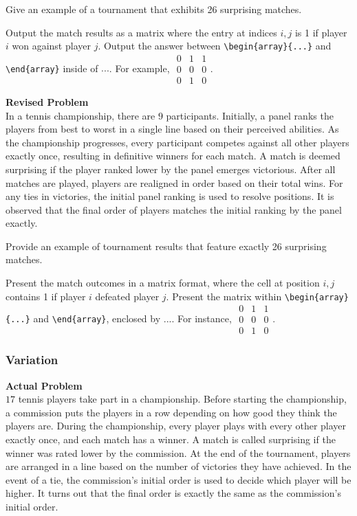Give an example of a tournament that exhibits 26 surprising matches.

Output the match results as a matrix where the entry at indices $i,j$ is 1 if player $i$ won against player $j$. Output the answer between \verb|\begin{array}{...}| and \verb|\end{array}| inside of $\boxed{...}$. For example, $\boxed{\begin{array}{ccc}0 & 1 & 1 \\ 0 & 0 & 0 \\ 0 & 1 & 0\end{array}}$.

\textbf{Revised Problem}\\
In a tennis championship, there are $9$ participants. Initially, a panel ranks the players from best to worst in a single line based on their perceived abilities. As the championship progresses, every participant competes against all other players exactly once, resulting in definitive winners for each match. A match is deemed surprising if the player ranked lower by the panel emerges victorious. After all matches are played, players are realigned in order based on their total wins. For any ties in victories, the initial panel ranking is used to resolve positions. It is observed that the final order of players matches the initial ranking by the panel exactly.

Provide an example of tournament results that feature exactly 26 surprising matches.

Present the match outcomes in a matrix format, where the cell at position $i,j$ contains 1 if player $i$ defeated player $j$. Present the matrix within \verb|\begin{array}{...}| and \verb|\end{array}|, enclosed by $\boxed{...}$. For instance, $\boxed{\begin{array}{ccc}0 & 1 & 1 \\ 0 & 0 & 0 \\ 0 & 1 & 0\end{array}}$.

\subsubsection{Variation}
\textbf{Actual Problem}\\
$17$ tennis players take part in a championship. Before starting the championship, a commission puts the players in a row depending on how good they think the players are. During the championship, every player plays with every other player exactly once, and each match has a winner. A match is called surprising if the winner was rated lower by the commission. At the end of the tournament, players are arranged in a line based on the number of victories they have achieved. In the event of a tie, the commission's initial order is used to decide which player will be higher.
It turns out that the final order is exactly the same as the commission's initial order. 

